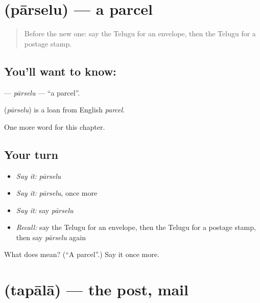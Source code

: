 \section[\texorpdfstring{\te{పార్సెలు} (pārselu)}{పార్సెలు (pārselu)}]{ (pārselu) — a parcel}

\label{lesson:TE-C185-parselu}



\begin{quote}
Before the new one: say the Telugu for an envelope, then the Telugu for a postage stamp.
\end{quote}

\subsection*{You'll want to know: }
\textbf{} — \emph{pārselu} — \textquotedblleft{}a parcel\textquotedblright{}.

\begin{cousinweb}
\textbf{} (\emph{pārselu}) is a loan from English \emph{parcel}.
\end{cousinweb}

\begin{grammarlens}[title={What you've built}]
One more word for this chapter.
\end{grammarlens}

\subsection*{Your turn}
\begin{itemize}
\raggedright
  \item \emph{Say it:} \emph{pārselu}
  \item \emph{Say it:} \emph{pārselu}, once more
  \item \emph{Say it:} say \emph{pārselu}
  \item \emph{Recall:} say the Telugu for an envelope, then the Telugu for a postage stamp, then say \emph{pārselu} again
\end{itemize}

\begin{tcolorbox}[breakable,colback=teal!4,colframe=teal!35!black,title={Before you move on}]
What does  mean? (\textquotedblleft{}A parcel\textquotedblright{}.) Say it once more.
\end{tcolorbox}
\section[\texorpdfstring{\te{తపాలా} (tapālā)}{తపాలా (tapālā)}]{ (tapālā) — the post, mail}

